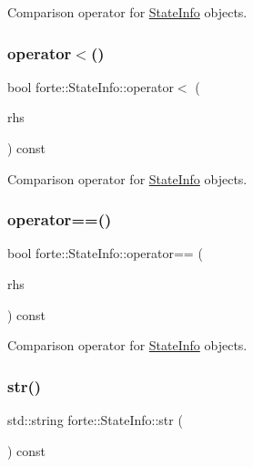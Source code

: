 Comparison operator for \mbox{\hyperlink{classforte_1_1_state_info}{State\+Info}} objects. 

\mbox{\label{classforte_1_1_state_info_a95242f2ef492eeb6740da98144039329}} 
\subsubsection{\texorpdfstring{operator$<$()}{operator<()}}
{\footnotesize\ttfamily bool forte\+::\+State\+Info\+::operator$<$ (\begin{DoxyParamCaption}\item[{const \mbox{\hyperlink{classforte_1_1_state_info}{State\+Info}} \&}]{rhs }\end{DoxyParamCaption}) const}



Comparison operator for \mbox{\hyperlink{classforte_1_1_state_info}{State\+Info}} objects. 

\mbox{\label{classforte_1_1_state_info_a8c20c22bb6cebf7f9c3a1238a4012bda}} 
\subsubsection{\texorpdfstring{operator==()}{operator==()}}
{\footnotesize\ttfamily bool forte\+::\+State\+Info\+::operator== (\begin{DoxyParamCaption}\item[{const \mbox{\hyperlink{classforte_1_1_state_info}{State\+Info}} \&}]{rhs }\end{DoxyParamCaption}) const}



Comparison operator for \mbox{\hyperlink{classforte_1_1_state_info}{State\+Info}} objects. 

\mbox{\label{classforte_1_1_state_info_a50b10a54b40621ef6147a8a1558665b5}} 
\subsubsection{\texorpdfstring{str()}{str()}}
{\footnotesize\ttfamily std\+::string forte\+::\+State\+Info\+::str (\begin{DoxyParamCaption}{ }\end{DoxyParamCaption}) const}



